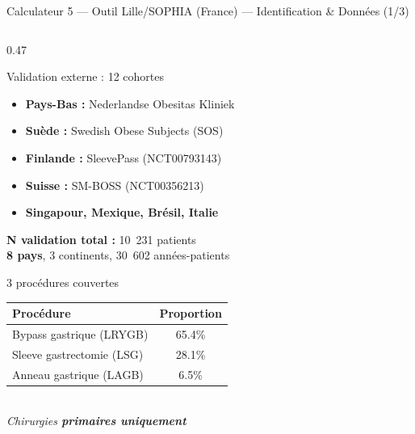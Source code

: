 \documentclass[aspectratio=169]{beamer}
\begin{document}
\begin{frame}{Calculateur 5 --- Outil Lille/SOPHIA (France) --- Identification \& Données (1/3)}
\begin{columns}[T]
\begin{column}{0.47\textwidth}
\begin{block}{Validation externe : 12 cohortes}
\begin{itemize}
                Valenciennes, Boulogne
          \item \textbf{Pays-Bas :} Nederlandse Obesitas Kliniek
          \item \textbf{Suède :} Swedish Obese Subjects (SOS)
          \item \textbf{Finlande :} SleevePass (NCT00793143)
          \item \textbf{Suisse :} SM-BOSS (NCT00356213)
          \item \textbf{Singapour, Mexique, Brésil, Italie}
        \end{itemize}
        \vspace{4pt}
        \textbf{N validation total :} 10~231 patients\\
        \textbf{8 pays}, 3 continents, 30~602 années-patients
      \end{block}
      \vspace{0.3em}
      \begin{block}{3 procédures couvertes}
        \footnotesize
        \begin{tabular}{lc}
          \toprule
          \textbf{Procédure} & \textbf{Proportion} \\
          \midrule
          Bypass gastrique (LRYGB) & 65.4\% \\
          Sleeve gastrectomie (LSG) & 28.1\% \\
          Anneau gastrique (LAGB)   & 6.5\%  \\
          \bottomrule
        \end{tabular}\\[4pt]
        \textit{Chirurgies \textbf{primaires uniquement}}
      \end{block}
    \end{column}
  \end{columns}
\end{frame}
\end{document}
